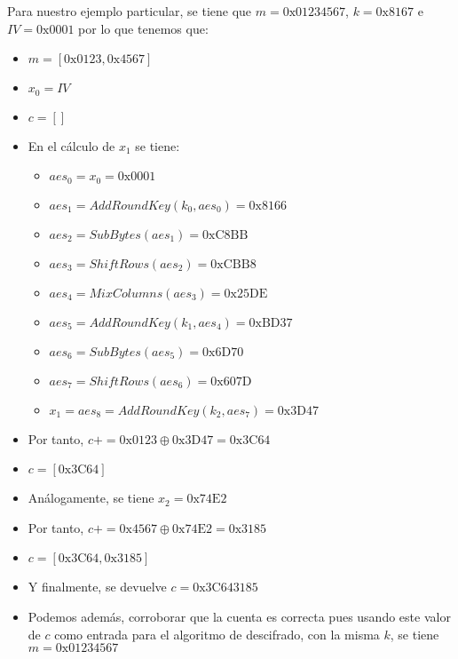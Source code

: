 \begin{enumerate}
		Para nuestro ejemplo particular, se tiene que $m = \mathrm{0x01234567}$, $k = \mathrm{0x8167}$ e
		$IV = \mathrm{0x0001}$ por lo que tenemos que:
		\begin{itemize}
			\item $m = [\mathrm{0x0123}, \mathrm{0x4567}]$
			\item $x_0 = IV$
			\item $c = []$
			\item En el cálculo de $x_1$ se tiene:
			\begin{itemize}
				\item $aes_0 = x_0 = \mathrm{0x0001}$
				\item $aes_1 = AddRoundKey(k_0, aes_0) = \mathrm{0x8166}$
				\item $aes_2 = SubBytes(aes_1) = \mathrm{0xC8BB}$
				\item $aes_3 = ShiftRows(aes_2) = \mathrm{0xCBB8}$
				\item $aes_4 = MixColumns(aes_3) = \mathrm{0x25DE}$
				\item $aes_5 = AddRoundKey(k_1, aes_4) = \mathrm{0xBD37}$
				\item $aes_6 = SubBytes(aes_5) = \mathrm{0x6D70}$
				\item $aes_7 = ShiftRows(aes_6) = \mathrm{0x607D}$
				\item $x_1 = aes_8 = AddRoundKey(k_2, aes_7) = \mathrm{0x3D47}$
			\end{itemize}
			\item Por tanto, $c += \mathrm{0x0123} \oplus \mathrm{0x3D47} = \mathrm{0x3C64}$
			\item $c = [\mathrm{0x3C64}]$
			\item Análogamente, se tiene $x_2 = \mathrm{0x74E2}$
			\item Por tanto, $c += \mathrm{0x4567} \oplus \mathrm{0x74E2} = \mathrm{0x3185}$
			\item $c = [\mathrm{0x3C64}, \mathrm{0x3185}]$
			\item Y finalmente, se devuelve $c = \mathrm{0x3C643185}$
			\item Podemos además, corroborar que la cuenta es correcta pues usando este valor de $c$ como
			entrada para el algoritmo de descifrado, con la misma $k$, se tiene $m = \mathrm{0x01234567}$
		\end{itemize}
		

\end{enumerate}
